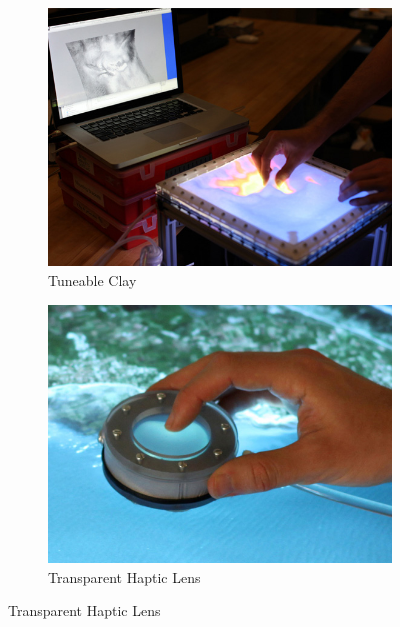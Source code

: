 \begin{figure}
        \centering
        \begin{subfigure}[b]{0.44\textwidth}
                \centering
                \includegraphics[width=\textwidth]{figures/jamming/jui_tunable-clay}
                \caption{Tuneable Clay}
                \label{fig:ch:jamming:jui-clay}
        \end{subfigure}
        \hspace{0.02\textwidth}
        \begin{subfigure}[b]{0.44\textwidth}
                \centering
                \includegraphics[width=\textwidth]{figures/jamming/jui_haptic-lens}
                \caption{Transparent Haptic Lens}
                \label{fig:ch:jamming:jui-lens}
        \end{subfigure}


\end{figure}
